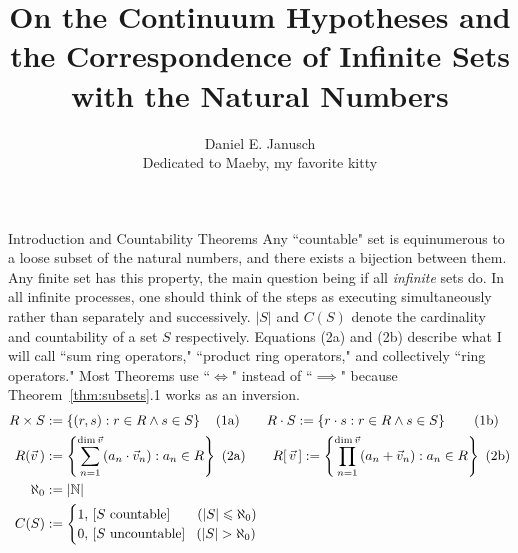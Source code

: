 \documentclass[12pt]{article}
\begin{document}
\title{On the Continuum Hypotheses and the Correspondence of Infinite Sets with the Natural Numbers}
\author{Daniel E. Janusch\\Dedicated to Maeby, my favorite kitty}
\maketitle

\begin{section}{Introduction and Countability Theorems}\label{sec:background}
	Any ``countable" set is equinumerous to a loose subset of the natural numbers, and
	there exists a bijection between them. Any finite set has this property, the main
	question being if all \emph{infinite} sets do. In all infinite processes, one should
	think of the steps as executing simultaneously rather than separately and successively.
	$|S|$ and $C(S)$ denote the cardinality and countability of a set $S$ respectively.
	Equations (2a) and (2b) describe what I will call ``sum ring operators," ``product
	ring operators," and collectively ``ring operators." Most Theorems use ``$\iff$"
	instead of ``$\implies$" because Theorem~\ref{thm:subsets}.1 works as an inversion.
	\vspace{-1em}\\
	\begin{align}
		R\times S & :=\{(r,s):r\in R\land s\in S\}~~~\,(1\text a)
		\hspace{2em}
		R\cdot S:=\{r\cdot s:r\in R\land s\in S\}~~~~~~\,(1\text b)
		\\
		R(\vec v\,) & :=\left\{\sum_{n=1}^{\dim\vec v}(a_n\cdot\vec v_n):a_n\in R\right\}~(2\text a)
		\hspace{2em}
		R[\,\vec v\,]:=\left\{\prod_{n=1}^{\dim\vec v}(a_n+\vec v_n):a_n\in R\right\}~(2\text b)\\
		\aleph_0 & := |\mathbb N|\\
		C(S) & :=\begin{cases}
			1,\,\left[S\text{ countable}\right]\phantom{un}~~(|S|\leqslant\aleph_0)\\
			0,\,\left[S\text{ uncountable}\right]~~(|S|>\aleph_0)\\
		\end{cases}
	\end{align}


\end{section}
\end{document}

